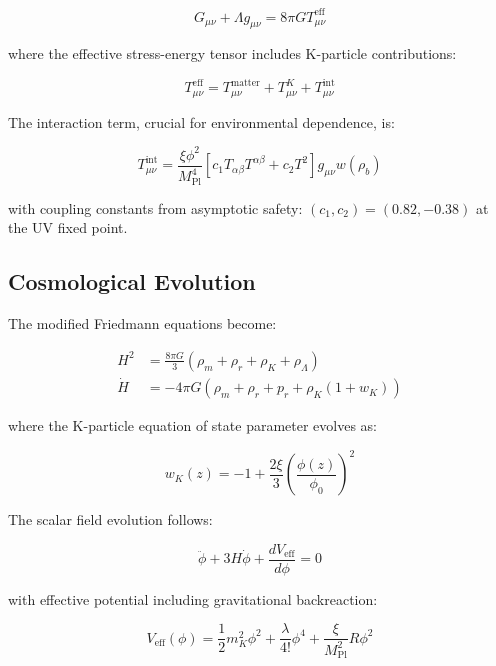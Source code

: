 \documentclass[aps,prd,twocolumn,showpacs,superscriptaddress,groupedaddress,nofootinbib]{revtex4-2}
\begin{document}
\begin{equation}
G_{\mu\nu} + \Lambda g_{\mu\nu} = 8\pi G T_{\mu\nu}^{\text{eff}}
\label{eq:einstein_modified}
\end{equation}

where the effective stress-energy tensor includes K-particle contributions:

\begin{equation}
T_{\mu\nu}^{\text{eff}} = T_{\mu\nu}^{\text{matter}} + T_{\mu\nu}^{K} + T_{\mu\nu}^{\text{int}}
\end{equation}

The interaction term, crucial for environmental dependence, is:

\begin{equation}
T_{\mu\nu}^{\text{int}} = \frac{\xi\phi^2}{M_{\text{Pl}}^4}\left[c_1 T_{\alpha\beta}T^{\alpha\beta} + c_2 T^2\right]g_{\mu\nu}w(\rho_b)
\label{eq:interaction}
\end{equation}

with coupling constants from asymptotic safety: $(c_1, c_2) = (0.82, -0.38)$ at the UV fixed point.

\subsection{Cosmological Evolution}

The modified Friedmann equations become:

\begin{align}
H^2 &= \frac{8\pi G}{3}\left(\rho_m + \rho_r + \rho_K + \rho_\Lambda\right) \\
\dot{H} &= -4\pi G\left(\rho_m + \rho_r + p_r + \rho_K(1 + w_K)\right)
\end{align}

where the K-particle equation of state parameter evolves as:

\begin{equation}
w_K(z) = -1 + \frac{2\xi}{3}\left(\frac{\phi(z)}{\phi_0}\right)^2
\label{eq:eos_k}
\end{equation}

The scalar field evolution follows:

\begin{equation}
\ddot{\phi} + 3H\dot{\phi} + \frac{dV_{\text{eff}}}{d\phi} = 0
\label{eq:klein_gordon}
\end{equation}

with effective potential including gravitational backreaction:

\begin{equation}
V_{\text{eff}}(\phi) = \frac{1}{2}m_K^2\phi^2 + \frac{\lambda}{4!}\phi^4 + \frac{\xi}{M_{\text{Pl}}^2}R\phi^2
\end{equation}
\end{document}
